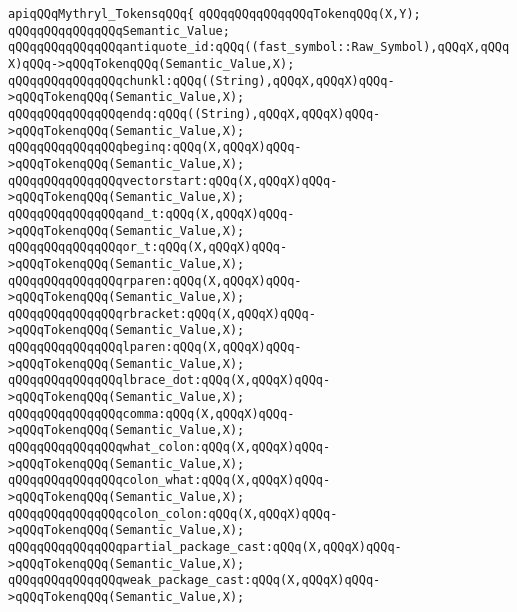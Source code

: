 \label{src/lib/compiler/front/parser/yacc/mythryl.grammar.api}
\verb|apiqQQqMythryl_TokensqQQq{|\newline
\verb|qQQqqQQqqQQqqQQqTokenqQQq(X,Y);|\newline
\verb|qQQqqQQqqQQqqQQqSemantic_Value;|\newline
\verb|qQQqqQQqqQQqqQQqantiquote_id:qQQq((fast_symbol::Raw_Symbol),qQQqX,qQQqX)qQQq->qQQqTokenqQQq(Semantic_Value,X);|\newline
\verb|qQQqqQQqqQQqqQQqchunkl:qQQq((String),qQQqX,qQQqX)qQQq->qQQqTokenqQQq(Semantic_Value,X);|\newline
\verb|qQQqqQQqqQQqqQQqendq:qQQq((String),qQQqX,qQQqX)qQQq->qQQqTokenqQQq(Semantic_Value,X);|\newline
\verb|qQQqqQQqqQQqqQQqbeginq:qQQq(X,qQQqX)qQQq->qQQqTokenqQQq(Semantic_Value,X);|\newline
\verb|qQQqqQQqqQQqqQQqvectorstart:qQQq(X,qQQqX)qQQq->qQQqTokenqQQq(Semantic_Value,X);|\newline
\verb|qQQqqQQqqQQqqQQqand_t:qQQq(X,qQQqX)qQQq->qQQqTokenqQQq(Semantic_Value,X);|\newline
\verb|qQQqqQQqqQQqqQQqor_t:qQQq(X,qQQqX)qQQq->qQQqTokenqQQq(Semantic_Value,X);|\newline
\verb|qQQqqQQqqQQqqQQqrparen:qQQq(X,qQQqX)qQQq->qQQqTokenqQQq(Semantic_Value,X);|\newline
\verb|qQQqqQQqqQQqqQQqrbracket:qQQq(X,qQQqX)qQQq->qQQqTokenqQQq(Semantic_Value,X);|\newline
\verb|qQQqqQQqqQQqqQQqlparen:qQQq(X,qQQqX)qQQq->qQQqTokenqQQq(Semantic_Value,X);|\newline
\verb|qQQqqQQqqQQqqQQqlbrace_dot:qQQq(X,qQQqX)qQQq->qQQqTokenqQQq(Semantic_Value,X);|\newline
\verb|qQQqqQQqqQQqqQQqcomma:qQQq(X,qQQqX)qQQq->qQQqTokenqQQq(Semantic_Value,X);|\newline
\verb|qQQqqQQqqQQqqQQqwhat_colon:qQQq(X,qQQqX)qQQq->qQQqTokenqQQq(Semantic_Value,X);|\newline
\verb|qQQqqQQqqQQqqQQqcolon_what:qQQq(X,qQQqX)qQQq->qQQqTokenqQQq(Semantic_Value,X);|\newline
\verb|qQQqqQQqqQQqqQQqcolon_colon:qQQq(X,qQQqX)qQQq->qQQqTokenqQQq(Semantic_Value,X);|\newline
\verb|qQQqqQQqqQQqqQQqpartial_package_cast:qQQq(X,qQQqX)qQQq->qQQqTokenqQQq(Semantic_Value,X);|\newline
\verb|qQQqqQQqqQQqqQQqweak_package_cast:qQQq(X,qQQqX)qQQq->qQQqTokenqQQq(Semantic_Value,X);|\newline
